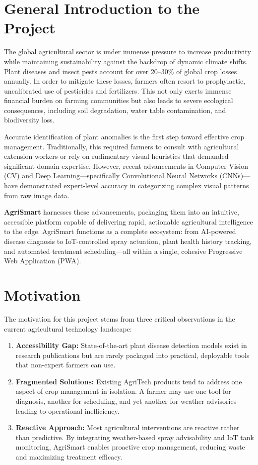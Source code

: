 \documentclass[12pt,a4paper]{report}
\begin{document}
\section{General Introduction to the Project}
The global agricultural sector is under immense pressure to increase productivity while maintaining sustainability against the backdrop of dynamic climate shifts. Plant diseases and insect pests account for over 20--30\% of global crop losses annually. In order to mitigate these losses, farmers often resort to prophylactic, uncalibrated use of pesticides and fertilizers. This not only exerts immense financial burden on farming communities but also leads to severe ecological consequences, including soil degradation, water table contamination, and biodiversity loss.

Accurate identification of plant anomalies is the first step toward effective crop management. Traditionally, this required farmers to consult with agricultural extension workers or rely on rudimentary visual heuristics that demanded significant domain expertise. However, recent advancements in Computer Vision (CV) and Deep Learning---specifically Convolutional Neural Networks (CNNs)---have demonstrated expert-level accuracy in categorizing complex visual patterns from raw image data.

\textbf{AgriSmart} harnesses these advancements, packaging them into an intuitive, accessible platform capable of delivering rapid, actionable agricultural intelligence to the edge. AgriSmart functions as a complete ecosystem: from AI-powered disease diagnosis to IoT-controlled spray actuation, plant health history tracking, and automated treatment scheduling---all within a single, cohesive Progressive Web Application (PWA).

\section{Motivation}
The motivation for this project stems from three critical observations in the current agricultural technology landscape:

\begin{enumerate}
  \item \textbf{Accessibility Gap:} State-of-the-art plant disease detection models exist in research publications but are rarely packaged into practical, deployable tools that non-expert farmers can use.
  
  \item \textbf{Fragmented Solutions:} Existing AgriTech products tend to address one aspect of crop management in isolation. A farmer may use one tool for diagnosis, another for scheduling, and yet another for weather advisories---leading to operational inefficiency.
  
  \item \textbf{Reactive Approach:} Most agricultural interventions are reactive rather than predictive. By integrating weather-based spray advisability and IoT tank monitoring, AgriSmart enables proactive crop management, reducing waste and maximizing treatment efficacy.
\end{enumerate}
\end{document}
